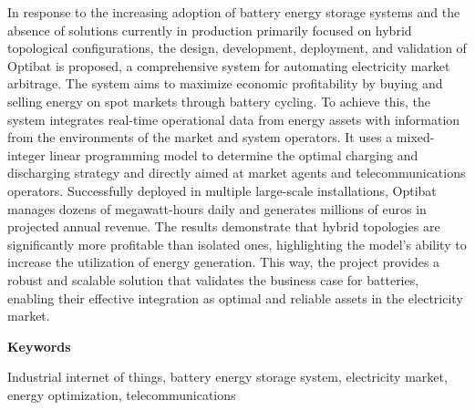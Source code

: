 \vspace{1cm}

In response to the increasing adoption of battery energy storage systems and the absence of solutions currently in production primarily focused on hybrid topological configurations, the design, development, deployment, and validation of Optibat is proposed, a comprehensive system for automating electricity market arbitrage. The system aims to maximize economic profitability by buying and selling energy on spot markets through battery cycling. To achieve this, the system integrates real-time operational data from energy assets with information from the environments of the market and system operators. It uses a mixed-integer linear programming model to determine the optimal charging and discharging strategy and directly aimed at market agents and telecommunications operators. Successfully deployed in multiple large-scale installations, Optibat manages dozens of megawatt-hours daily and generates millions of euros in projected annual revenue. The results demonstrate that hybrid topologies are significantly more profitable than isolated ones, highlighting the model's ability to increase the utilization of energy generation. This way, the project provides a robust and scalable solution that validates the business case for batteries, enabling their effective integration as optimal and reliable assets in the electricity market.

\vspace{1cm}

\begin{center}
  {\bf \large Keywords}
\end{center}

\vspace{0.5cm}

Industrial internet of things, battery energy storage system, electricity market, energy optimization, telecommunications
